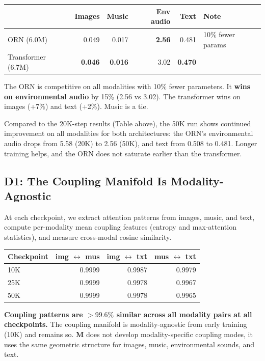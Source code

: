 \documentclass[11pt, a4paper]{article}
\newcommand{\M}{\mathbf{M}}
\theoremstyle{plain}
\theoremstyle{remark}
\begin{document}
\begin{center}\small
\begin{tabular}{@{}lrrrrl@{}}
\toprule
& \textbf{Images} & \textbf{Music} & \textbf{Env audio} & \textbf{Text} & \textbf{Note} \\
\midrule
ORN (6.0M)        & 0.049 & 0.017 & \textbf{2.56} & 0.481 & 10\% fewer params \\
Transformer (6.7M) & \textbf{0.046} & \textbf{0.016} & 3.02 & \textbf{0.470} & \\
\bottomrule
\end{tabular}
\end{center}

The ORN is competitive on all modalities with 10\% fewer parameters.
It \textbf{wins on environmental audio} by 15\% (2.56 vs 3.02).
The transformer wins on images (+7\%) and text (+2\%).
Music is a tie.

Compared to the 20K-step results (Table above), the 50K run shows continued improvement on all modalities for both architectures: the ORN's environmental audio drops from 5.58 (20K) to 2.56 (50K), and text from 0.508 to 0.481.
Longer training helps, and the ORN does not saturate earlier than the transformer.

\subsection{D1: The Coupling Manifold Is Modality-Agnostic}

At each checkpoint, we extract attention patterns from images, music, and text, compute per-modality mean coupling features (entropy and max-attention statistics), and measure cross-modal cosine similarity.

\begin{center}\small
\begin{tabular}{@{}lrrr@{}}
\toprule
\textbf{Checkpoint} & \textbf{img $\leftrightarrow$ mus} & \textbf{img $\leftrightarrow$ txt} & \textbf{mus $\leftrightarrow$ txt} \\
\midrule
10K  & 0.9999 & 0.9987 & 0.9979 \\
25K  & 0.9999 & 0.9978 & 0.9967 \\
50K  & 0.9999 & 0.9978 & 0.9965 \\
\bottomrule
\end{tabular}
\end{center}

\textbf{Coupling patterns are $> 99.6\%$ similar across all modality pairs at all checkpoints.}
The coupling manifold is modality-agnostic from early training (10K) and remains so.
$\M$ does not develop modality-specific coupling modes, it uses the same geometric structure for images, music, environmental sounds, and text.
\end{document}
